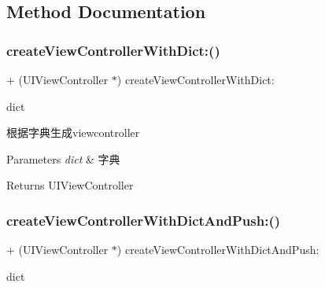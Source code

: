 \subsection{Method Documentation}
\mbox{\label{interface_d3_generator_ae6507d6ef5433366f40be9762ffb5b01}} 
\subsubsection{\texorpdfstring{create\+View\+Controller\+With\+Dict\+:()}{createViewControllerWithDict:()}}
{\footnotesize\ttfamily + (U\+I\+View\+Controller $\ast$) create\+View\+Controller\+With\+Dict\+: \begin{DoxyParamCaption}\item[{(N\+S\+Dictionary$\ast$)}]{dict }\end{DoxyParamCaption}}

根据字典生成viewcontroller


\begin{DoxyParams}{Parameters}
{\em dict} & 字典\\
\hline
\end{DoxyParams}
\begin{DoxyReturn}{Returns}
U\+I\+View\+Controller 
\end{DoxyReturn}
\mbox{\label{interface_d3_generator_a341215ec01f51ca7759029dec6b41dce}} 
\subsubsection{\texorpdfstring{create\+View\+Controller\+With\+Dict\+And\+Push\+:()}{createViewControllerWithDictAndPush:()}}
{\footnotesize\ttfamily + (U\+I\+View\+Controller $\ast$) create\+View\+Controller\+With\+Dict\+And\+Push\+: \begin{DoxyParamCaption}\item[{(N\+S\+Dictionary$\ast$)}]{dict }\end{DoxyParamCaption}}

